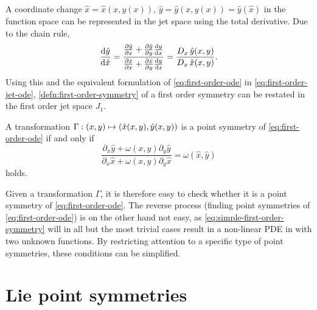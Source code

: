 A coordinate change \(\hat{x} = \hat{x}(x, y(x)),\, \hat{y} = \hat{y}(x, y(x)) = \hat{y}(\hat{x})\) in the function space can be represented in the jet space using the total derivative.
Due to the chain rule,
\begin{equation}
  \dv{\hat{y}}{\hat{x}} = 
  \frac{\pdv{\hat{y}}{x} + \pdv{\hat{y}}{y} \dv{y}{x}}{\pdv{\hat{x}}{x} + \pdv{\hat{x}}{y} \dv{y}{x}} =
  \frac{D_{x}\, \hat{y}(x,y)}{D_{x}\, \hat{x}(x,y)}.
\end{equation}
Using this and the equivalent formulation of \cref{eq:first-order-ode} in \cref{eq:first-order-jet-ode}, \cref{defn:first-order-symmetry} of a first order symmetry can be restated in the first order jet space \(J_1\).
\begin{lem} \label{lem:simple-first-order-symmetry}
  A transformation \(\Gamma: \pqty{x,y} \mapsto \pqty{\hat{x}(x,y), \hat{y}(x,y)}\) is a point symmetry of \cref{eq:first-order-ode} if and only if
  \begin{equation} \label{eq:simple-first-order-symmetry}
    \frac{\partial_x \hat{y} + \omega(x,y) \partial_y \hat{y}}{\partial_x \hat{x} + \omega(x,y) \partial_y \hat{x}} = \omega(\hat{x},\hat{y})
  \end{equation}
  holds.
\end{lem} %
Given a transformation \(\Gamma\), it is therefore easy to check whether it is a point symmetry of \cref{eq:first-order-ode}.
The reverse process (finding point symmetries of \cref{eq:first-order-ode}) is on the other hand not easy, as \cref{eq:simple-first-order-symmetry} will in all but the most trivial cases result in a non-linear PDE in with two unknown functions.
By restricting attention to a specific type of point symmetries, these conditions can be simplified.

\section{Lie point symmetries}

